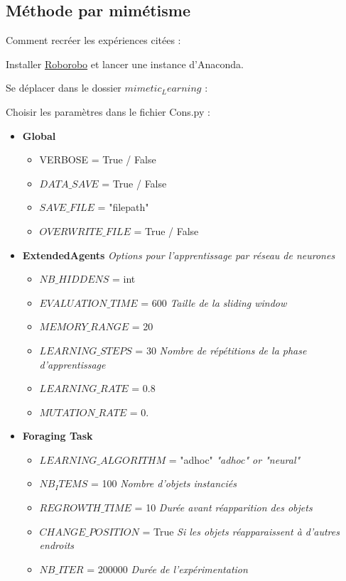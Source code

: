 \documentclass[a4paper, 12pt]{report}
\begin{document}
    \subsection{Méthode par mimétisme}
Comment recréer les expériences citées :

Installer \href{https://github.com/nekonaute/roborobo4}{Roborobo} et lancer une instance d'Anaconda.

Se déplacer dans le dossier $mimetic_Learning$ :

Choisir les paramètres dans le fichier Cons.py :
\begin{itemize}
\item\textbf{Global}
	\begin{itemize}
		\item{VERBOSE = True / False}
		\item{$DATA\_SAVE$ = True / False}
		\item{$SAVE\_FILE$ = "filepath"}
		\item{$OVERWRITE\_FILE$ = True / False}
	\end{itemize}
\item\textbf{ExtendedAgents}
\textit{Options pour l'apprentissage par réseau de neurones}
	\begin{itemize}
		\item{$NB\_HIDDENS$ = int}
		\item{$EVALUATION\_TIME$ = 600				\textit{Taille de la sliding window}}
		\item{$MEMORY\_RANGE$ = 20}
		\item{$LEARNING\_STEPS$ = 30		\textit{Nombre de répétitions de la phase d'apprentissage}}
		\item{$LEARNING\_RATE$ = 0.8}
		\item{$MUTATION\_RATE$ = 0.}
	\end{itemize}
\item{\textbf{Foraging Task}}
	\begin{itemize}
		\item{$LEARNING\_ALGORITHM$ = "adhoc"        \textit{"adhoc" or "neural"}}
		\item{$NB_ITEMS$ = 100						\textit{Nombre d'objets instanciés}}
		\item{$REGROWTH\_TIME$ = 10	\textit{Durée avant réapparition des objets}}
		\item{$CHANGE\_POSITION$ = True				\textit{Si les objets réapparaissent à d'autres endroits}}
		\item{$NB\_ITER$ = 200000					\textit{Durée de l'expérimentation}}
	\end{itemize}


\end{itemize}
\end{document}

